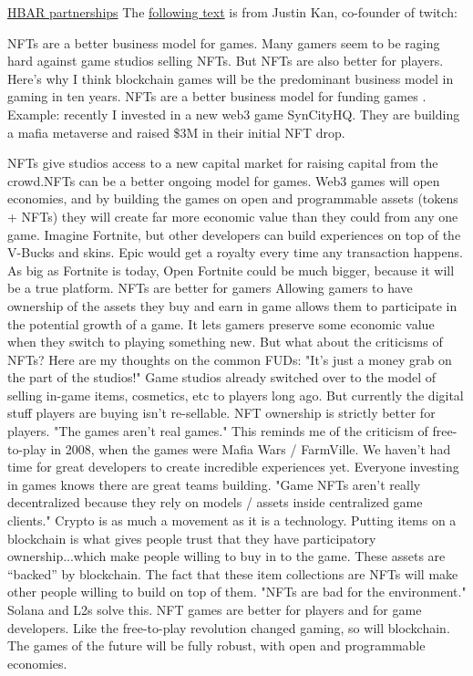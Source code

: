 \href{https://www.prnewswire.com/news-releases/hbar-foundation-and-ubisoft-partner-to-support-growth-of-gaming-on-hedera-network-301474971.html}{HBAR partnerships}
The \href{https://twitter.com/justinkan/status/1491270239967154178}{following text} is from Justin Kan, co-founder of twitch:
\begin{fminipage}{\textwidth}
NFTs are a better business model for games. Many gamers seem to be raging hard against game studios selling NFTs. But NFTs are also better for players. Here’s why I think blockchain games will be the predominant business model in gaming in ten years. NFTs are a better business model for funding games . Example: recently I invested in a new web3 game SynCityHQ. They are building a mafia metaverse and raised \$3M in their initial NFT drop.\par
NFTs give studios access to a new capital market for raising capital from the crowd.NFTs can be a better ongoing model for games. Web3 games will open economies, and by building the games on open and programmable assets (tokens + NFTs) they will create far more economic value than they could from any one game. Imagine Fortnite, but other developers can build experiences on top of the V-Bucks and skins. Epic would get a royalty every time any transaction happens. As big as Fortnite is today, Open Fortnite could be much bigger, because it will be a true platform. NFTs are better for gamers Allowing gamers to have ownership of the assets they buy and earn in game allows them to participate in the potential growth of a game. It lets gamers preserve some economic value when they switch to playing something new. But what about the criticisms of NFTs?
Here are my thoughts on the common FUDs: "It’s just a money grab on the part of the studios!"
Game studios already switched over to the model of selling in-game items, cosmetics, etc to players long ago. But currently the digital stuff players are buying isn’t re-sellable. NFT ownership is strictly better for players. "The games aren’t real games." This reminds me of the criticism of free-to-play in 2008, when the games were Mafia Wars / FarmVille. We haven’t had time for great developers to create incredible experiences yet. Everyone investing in games knows there are great teams building. "Game NFTs aren’t really decentralized because they rely on models / assets inside centralized game clients."
Crypto is as much a movement as it is a technology. Putting items on a blockchain is what gives people trust that they have participatory ownership...which make people willing to buy in to the game. These assets are “backed” by blockchain.
The fact that these item collections are NFTs will make other people willing to build on top of them. "NFTs are bad for the environment." Solana and L2s solve this. NFT games are better for players and for game developers. Like the free-to-play revolution changed gaming, so will blockchain. The games of the future will be fully robust, with open and programmable economies.
\end{fminipage}




